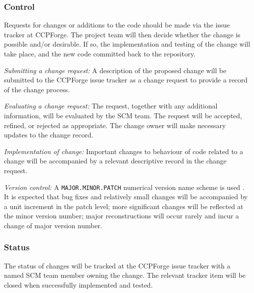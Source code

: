 



\subsubsection{Control}

Requests for changes or additions to the code should be made via
the issue tracker at CCPForge. The project team will then decide
whether the change is possible and/or desirable. If so, the
implementation and testing of the change will take place, and the
new code committed back to the repository.

\textit{Submitting a change request:} A description of the proposed change
will be submitted to the CCPForge issue tracker as a change request to
provide a record of the change process.

\textit{Evaluating a change request:} The request, together with any
additional information, will be evaluated by the SCM team. The request
will be accepted, refined, or rejected as appropriate. The change owner
will make necessary updates to the change record.

\textit{Implementation of change:} Important changes to behaviour of code
related to a change will be
accompanied by a relevant descriptive record in the change request.

\textit{Version control:} A \texttt{MAJOR.MINOR.PATCH} numerical version
name scheme is used \cite{apacheAPR}.
It is expected that bug fixes and relatively
small changes will be accompanied by a unit increment in the patch level;
more significant changes will be reflected at the minor version number;
major reconstructions will occur rarely and incur a change of major version
number.

\subsubsection{Status}


The status of changes will be tracked at the CCPForge issue tracker
with a named SCM team member owning the change. The relevant tracker
item will be closed when successfully implemented and tested.


